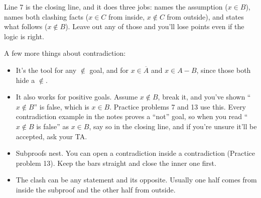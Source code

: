 \begin{center}
\end{center}

Line 7 is the closing line, and it does three jobs: names the assumption ($x\in B$), names both clashing facts ($x\in C$ from inside, $x\notin C$ from outside), and states what follows ($x\notin B$). Leave out any of those and you'll lose points even if the logic is right.

A few more things about contradiction:

\begin{itemize}
  \item It's the tool for any $\notin$ goal, and for $x\in\overline{A}$ and $x\in A-B$, since those both hide a $\notin$.
  \item It also works for positive goals. Assume $x\notin B$, break it, and you've shown ``$x\notin B$'' is false, which is $x\in B$. Practice problems 7 and 13 use this. Every contradiction example in the notes proves a ``not'' goal, so when you read ``$x\notin B$ is false'' as $x\in B$, say so in the closing line, and if you're unsure it'll be accepted, ask your TA.
  \item Subproofs nest. You can open a contradiction inside a contradiction (Practice problem 13). Keep the bars straight and close the inner one first.
  \item The clash can be any statement and its opposite. Usually one half comes from inside the subproof and the other half from outside.
\end{itemize}

